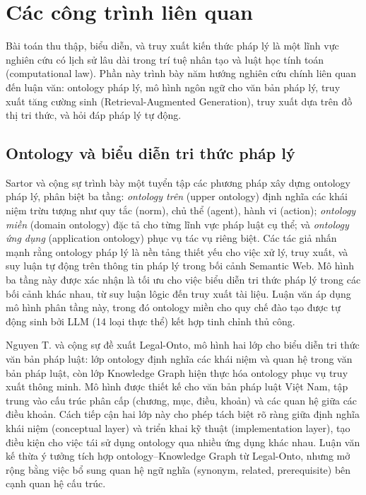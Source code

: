 \section{Các công trình liên quan}
\label{sec:cong-trinh-lien-quan}

Bài toán thu thập, biểu diễn, và truy xuất kiến thức pháp lý là một lĩnh vực nghiên
cứu có lịch sử lâu dài trong trí tuệ nhân tạo và luật học tính toán (computational
law). Phần này trình bày năm hướng nghiên cứu chính liên quan đến luận văn: ontology
pháp lý, mô hình ngôn ngữ cho văn bản pháp lý, truy xuất tăng cường sinh
(Retrieval-Augmented Generation), truy xuất dựa trên đồ thị tri thức, và hỏi đáp
pháp lý tự động.

\subsection{Ontology và biểu diễn tri thức pháp lý}
\label{subsec:ontology-phap-ly}

Sartor và cộng sự \cite{sartor2011legalonto} trình bày một tuyển tập các phương pháp
xây dựng ontology pháp lý, phân biệt ba tầng: \textit{ontology trên} (upper ontology)
định nghĩa các khái niệm trừu tượng như quy tắc (norm), chủ thể (agent), hành vi
(action); \textit{ontology miền} (domain ontology) đặc tả cho từng lĩnh vực pháp
luật cụ thể; và \textit{ontology ứng dụng} (application ontology) phục vụ tác vụ
riêng biệt. Các tác giả nhấn mạnh rằng ontology pháp lý là nền tảng thiết yếu cho
việc xử lý, truy xuất, và suy luận tự động trên thông tin pháp lý trong bối cảnh
Semantic Web. Mô hình ba tầng này được xác nhận là tối ưu cho việc biểu diễn tri
thức pháp lý trong các bối cảnh khác nhau, từ suy luận lôgic đến truy xuất tài liệu.
Luận văn áp dụng mô hình phân tầng này, trong đó ontology miền cho quy chế đào tạo
được tự động sinh bởi LLM (14 loại thực thể) kết hợp tinh chỉnh thủ công.

Nguyen T. và cộng sự \cite{nguyen2022legalonto} đề xuất Legal-Onto, mô hình hai lớp
cho biểu diễn tri thức văn bản pháp luật: lớp ontology định nghĩa các khái niệm
và quan hệ trong văn bản pháp luật, còn lớp Knowledge Graph hiện thực hóa
ontology phục vụ truy xuất thông minh. Mô hình được thiết kế cho văn bản pháp luật
Việt Nam, tập trung vào cấu trúc phân cấp (chương, mục, điều, khoản) và các quan
hệ giữa các điều khoản. Cách tiếp cận hai lớp này cho phép tách biệt rõ ràng giữa
định nghĩa khái niệm (conceptual layer) và triển khai kỹ thuật (implementation
layer), tạo điều kiện cho việc tái sử dụng ontology qua nhiều ứng dụng khác nhau.
Luận văn kế thừa ý tưởng tích hợp ontology--Knowledge Graph từ Legal-Onto, nhưng
mở rộng bằng việc bổ sung quan hệ ngữ nghĩa (synonym, related, prerequisite) bên
cạnh quan hệ cấu trúc.

